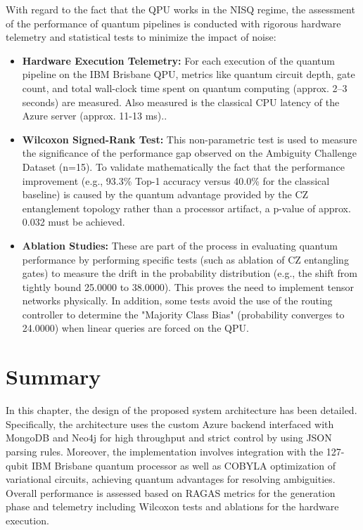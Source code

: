 With regard to the fact that the QPU works in the NISQ regime, the assessment of the performance of quantum pipelines is conducted with rigorous hardware telemetry and statistical tests to minimize the impact of noise:
\begin{itemize}
	\item \textbf{Hardware Execution Telemetry:} For each execution of the quantum pipeline on the IBM Brisbane QPU, metrics like quantum circuit depth, gate count, and total wall-clock time spent on quantum computing (approx. 2–3 seconds) are measured. Also measured is the classical CPU latency of the Azure server (approx. 11-13 ms)..
	\item \textbf{Wilcoxon Signed-Rank Test:} This non-parametric test is used to measure the significance of the performance gap observed on the Ambiguity Challenge Dataset (n=15). To validate mathematically the fact that the performance improvement (e.g., 93.3\% Top-1 accuracy versus 40.0\% for the classical baseline) is caused by the quantum advantage provided by the CZ entanglement topology rather than a processor artifact, a p-value of approx. 0.032 must be achieved.
	\item \textbf{Ablation Studies:} These are part of the process in evaluating quantum performance by performing specific tests (such as ablation of CZ entangling gates) to measure the drift in the probability distribution (e.g., the shift from tightly bound 25.0000 to 38.0000). This proves the need to implement tensor networks physically. In addition, some tests avoid the use of the routing controller to determine the "Majority Class Bias" (probability converges to 24.0000) when linear queries are forced on the QPU.
\end{itemize}

\section{Summary}

In this chapter, the design of the proposed system architecture has been detailed. Specifically, the architecture uses the custom Azure backend interfaced with MongoDB and Neo4j for high throughput and strict control by using JSON parsing rules. Moreover, the implementation involves integration with the 127-qubit IBM Brisbane quantum processor as well as COBYLA optimization of variational circuits, achieving quantum advantages for resolving ambiguities. Overall performance is assessed based on RAGAS metrics for the generation phase and telemetry including Wilcoxon tests and ablations for the hardware execution.